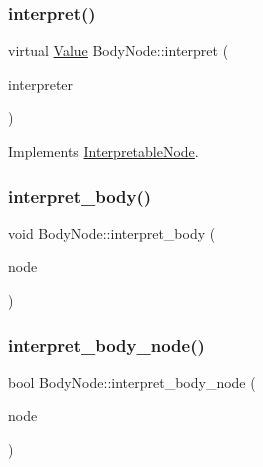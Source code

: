 \subsubsection{\texorpdfstring{interpret()}{interpret()}}
{\footnotesize\ttfamily virtual \hyperlink{classValue}{Value} Body\+Node\+::interpret (\begin{DoxyParamCaption}\item[{\hyperlink{classInterpreter}{Interpreter} $\ast$}]{interpreter }\end{DoxyParamCaption})\hspace{0.3cm}{\ttfamily [virtual]}}



Implements \hyperlink{classInterpretableNode_a9a466e7d65c4b323d2b96b4ac8396cd7}{Interpretable\+Node}.

\mbox{\label{classBodyNode_a9b6bafc8338e35a034aff1a23d519b1e}} 
\subsubsection{\texorpdfstring{interpret\+\_\+body()}{interpret\_body()}}
{\footnotesize\ttfamily void Body\+Node\+::interpret\+\_\+body (\begin{DoxyParamCaption}\item[{\hyperlink{classBodyNode}{Body\+Node} $\ast$}]{node }\end{DoxyParamCaption})}

\mbox{\label{classBodyNode_a7019e16f431cbf8975b1fde622d47d77}} 
\subsubsection{\texorpdfstring{interpret\+\_\+body\+\_\+node()}{interpret\_body\_node()}}
{\footnotesize\ttfamily bool Body\+Node\+::interpret\+\_\+body\+\_\+node (\begin{DoxyParamCaption}\item[{\hyperlink{classNode}{Node} $\ast$}]{node }\end{DoxyParamCaption})}

\mbox{\label{classBodyNode_a8b27949f189186af47dd81336d0d5ce7}} 

